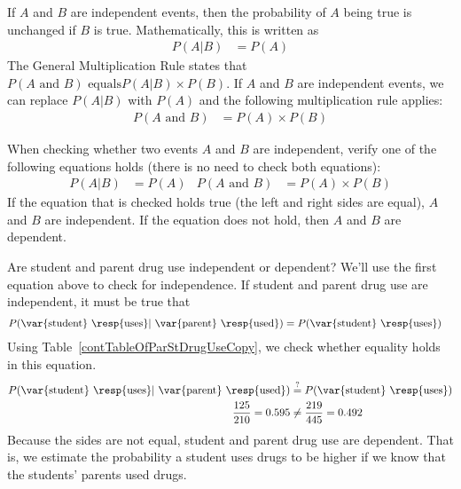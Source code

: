 If $A$ and $B$ are independent events, then the probability of $A$ being true is unchanged if $B$ is true. Mathematically, this is written as
\begin{align*}
P(A|B) &= P(A)
\end{align*}
The General Multiplication Rule states that $P(A\text{ and }B) \text{ equals}P(A | B)\times P(B)$. If $A$ and $B$ are independent events, we can replace $P(A|B)$ with $P(A)$ and the following multiplication rule applies:
\begin{align*}
P(A\text{ and }B) &= P(A)\times P(B)
\end{align*}

\begin{tipBox}{
When checking whether two events $A$ and $B$ are independent, verify one of the following equations holds (there is no need to check both equations):
\begin{align*}
P(A|B) &= P(A)&
P(A\text{ and }B) &= P(A)\times P(B)
\end{align*}
If the equation that is checked holds true (the left and right sides are equal), $A$ and $B$ are independent. If the equation does not hold, then $A$ and $B$ are dependent.}
\end{tipBox}

\begin{example}{Are student and parent drug use independent or dependent?}\label{studentParentDrugUseIndependentExample}
We'll use the first equation above to check for independence. If student and parent drug use are independent, it must be true that
\begin{align*}
P(\text{\var{student} \resp{uses}} | \text{ \var{parent} \resp{used}}) &= P(\text{\var{student} \resp{uses}})
\end{align*}
Using Table~\ref{contTableOfParStDrugUseCopy}, we check whether equality holds in this equation.
\begin{align*}
P(\text{\var{student} \resp{uses}} | \text{ \var{parent} \resp{used}}) &\overset{?}{=} P(\text{\var{student} \resp{uses}}) \\
\frac{125}{210}=0.595 &\neq \frac{219}{445}=0.492
\end{align*}
Because the sides are not equal, student and parent drug use are dependent. That is, we estimate the probability a student uses drugs to be higher if we know that the students' parents used drugs.
\end{example}

